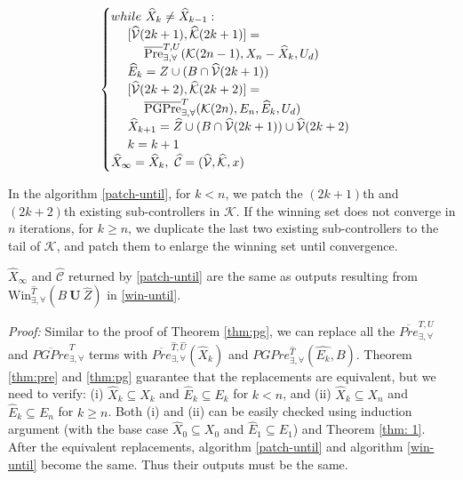 {\begin{align}
\begin{split}
\begin{cases}
{\color{black} while \ \widehat{X}_{k}\not=\widehat{X}_{k-1}:}\\
\ \ \ \ [\widehat{\mathcal{V}}(2k+1),\widehat{\mathcal{K}}(2k+1)] = \\ \ \ \ \ \ \ \ \ \overline{\text{Pre}}_{\exists,\forall}^{T,U}(\mathcal{K}(2n-1),X_{n}-\widehat{X}_{k}, U_d)\\
\ \ \ \ \widehat{E}_k =  Z\cup (B\cap \widehat{\mathcal{V}}(2k+1))\\
\ \ \ \ [\widehat{\mathcal{V}}(2k+2),\widehat{\mathcal{K}}(2k+2)] =\\ 
\ \ \ \ \ \ \ \ \overline{\text{PGPre}}_{\exists,\forall}^{T}(\mathcal{K}(2n),E_n, \widehat{E}_k,U_d)\\
\ \ \ \ \widehat{X}_{k+1} =\widehat{Z}\cup (B\cap \widehat{\mathcal{V}}(2k+1)) \cup \widehat{\mathcal{V}}(2k+2)\\
\ \ \ \ {\color{black} k=k+1}\\
\widehat{X}_\infty = \widehat{X}_k,\ \widehat{\mathcal{C}} = (\widehat{\mathcal{V}},\widehat{\mathcal{K}},x)
\end{cases} \label{patch-until}
\end{split}
\end{align}}

In the algorithm \eqref{patch-until}, for $ k <n $, we patch the $ (2k+1) $th and $ (2k+2) $th existing sub-controllers in $ \mathcal{K} $. If the winning set does not converge in $ n $ iterations, for $ k\geq n $, we duplicate the last two existing sub-controllers to the tail of $ \mathcal{K} $, and patch them to enlarge the winning set until convergence. 
\begin{theorem}
	$ \widehat{X}_\infty $ and $ \widehat{\mathcal{C}} $ returned by \eqref{patch-until} are the same as outputs resulting from $ \text{Win}_{\exists,\forall}^{\widehat{T}}(B\mathbf{\ U\ }\widehat{Z})  $ in \eqref{win-until}.\label{thm:until}	
\end{theorem}

\emph{Proof:} Similar to the proof of Theorem \ref{thm:pg}, we can replace all the $ \overline{Pre}_{\exists,\forall}^{T,U} $ and $ \overline{PGPre}_{\exists,\forall}^{T} $ terms with $ \overline{Pre}_{\exists,\forall}^{\widehat{T},\widehat{U}}(\widehat{X}_k) $ and $PGPre_{\exists,\forall}^{\widehat{T}}(\widehat{E_k},B)$. Theorem \ref{thm:pre} and \ref{thm:pg} guarantee that the replacements are equivalent, but we need to verify: (i) $ \widehat{X}_k \subseteq X_k $ and $ \widehat{E}_k \subseteq E_k $ for $ k < n $, and (ii) $ \widehat{X}_k \subseteq X_n $ and $ \widehat{E}_k \subseteq E_n $ for $ k\geq n $. Both (i) and (ii) can be easily checked using induction argument (with the base case $ \widehat{X}_0\subseteq X_0 $ and $ \widehat{E}_1\subseteq E_1 $) and Theorem \ref{thm: 1}. After the equivalent replacements, algorithm \eqref{patch-until} and algorithm \eqref{win-until} become the same. Thus their outputs must be the same. \QEDB

